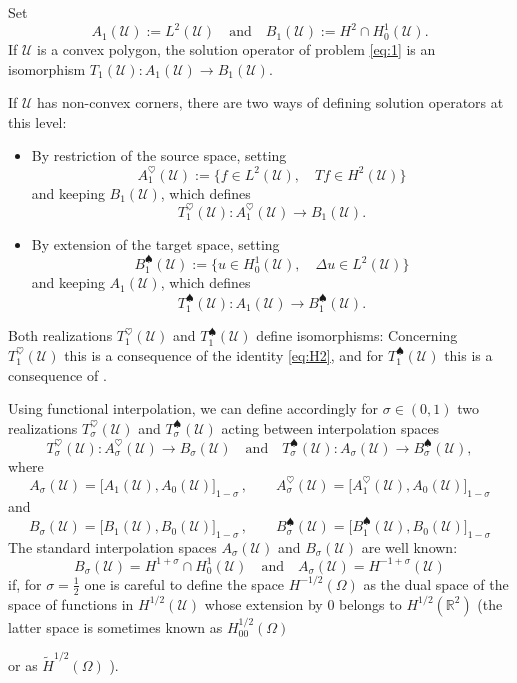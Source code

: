 \documentclass[titlepage,12pt]{amsart}
\theoremstyle{definition}
\theoremstyle{remark}
\numberwithin{equation}{section}
\newcommand\R{{\mathbb R}}
\newcommand{\sU}{{\mathscr U}}
\begin{document}
{Set
\[
   A_1(\sU) := L^2(\sU)\quad\mbox{and}\quad B_1(\sU) := H^2\cap H^1_0(\sU).
\] 
If $\sU$ is a convex polygon, the solution operator of problem \eqref{eq:1} is an isomorphism $T_1(\sU):A_1(\sU)\to B_1(\sU)$. 
\smallskip

If $\sU$ has non-convex corners, there are two ways of defining solution operators at this level:
\begin{itemize}
\item By restriction of the source space, setting
\[
   A_1^\heartsuit(\sU) := \{f\in L^2(\sU),\quad Tf\in H^2(\sU)\}
\]
and keeping $B_1(\sU)$, which defines
\[
   T_1^\heartsuit(\sU) : A_1^\heartsuit(\sU) \longrightarrow B_1(\sU).
\]
\item By extension of the target space, setting
\[
   B_1^\spadesuit(\sU) := \{u\in H^1_0(\sU),\quad \Delta u\in L^2(\sU)\}
\]
and keeping $A_1(\sU)$, which defines
\[
   T_1^\spadesuit(\sU) : A_1(\sU) \longrightarrow B_1^\spadesuit(\sU).
\]
\end{itemize}
Both realizations $T_1^\heartsuit(\sU)$ and $T_1^\spadesuit(\sU)$ define isomorphisms: Concerning $T_1^\heartsuit(\sU)$ this is a consequence of the identity \eqref{eq:H2}, and for $T_1^\spadesuit(\sU)$ this is a consequence of \cite{Kond:1967,Grisvard:1972}.

Using functional interpolation, we can define accordingly for $\sigma\in(0,1)$ two realizations $T_\sigma^\heartsuit(\sU)$ and $T_\sigma^\spadesuit(\sU)$ acting between interpolation spaces 
\[
   T_\sigma^\heartsuit(\sU) : A_\sigma^\heartsuit(\sU) \longrightarrow B_\sigma(\sU)
   \quad\mbox{and}\quad
   T_\sigma^\spadesuit(\sU) : A_\sigma(\sU) \longrightarrow B_\sigma^\spadesuit(\sU),
\]
where
\[
   A_\sigma(\sU) = \big[A_1(\sU),A_0(\sU)\big]_{1-\sigma}\,, 
   \quad\quad
   A_\sigma^\heartsuit(\sU) = \big[A_1^\heartsuit(\sU),A_0(\sU)\big]_{1-\sigma}
\]
and
\[
   B_\sigma(\sU) = \big[B_1(\sU),B_0(\sU)\big]_{1-\sigma}\,, 
   \quad\quad
   B_\sigma^\spadesuit(\sU) = \big[B_1^\spadesuit(\sU),B_0(\sU)\big]_{1-\sigma}
\]
The standard interpolation spaces $A_\sigma(\sU)$ and $B_\sigma(\sU)$ are well known:
\begin{equation}
\label{eq:StInterp}
   B_\sigma(\sU) = H^{1+\sigma}\cap H^1_0(\sU)
   \quad\mbox{and}\quad
   A_\sigma(\sU) = H^{-1+\sigma}(\sU)
\end{equation}
if, for $\sigma=\frac{1}{2}$ one is careful to define the space $H^{-1/2}(\Omega)$  
as the dual space of the space of functions in $H^{1/2}(\sU)$ whose extension by $0$ belongs to $H^{1/2}(\R^2)$ (the latter space is sometimes known as $H^{1/2}_{00}(\Omega)$  \cite{LionsMagenes68}} or as $\widetilde H^{1/2}(\Omega)$ \cite{Triebel78}).
\end{document}

